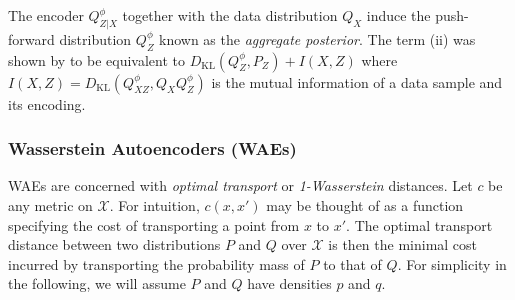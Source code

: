 The encoder $Q^\phi_{Z|X}$ together with the data distribution $Q_X$ induce the push-forward distribution $Q^\phi_Z$ known as the \emph{aggregate posterior}.
The term (ii) was shown by \cite{hoffman2016elbo} to be equivalent to $D_{\text{KL}}(Q^\phi_Z , P_Z) + I(X,Z)$ where $I(X,Z) = D_{\text{KL}}(Q^\phi_{XZ} , Q_XQ^\phi_{Z})$ is the mutual information of a data sample and its encoding.





\subsubsection{Wasserstein Autoencoders (WAEs)}


WAEs \citep{tolstikhin et al} are concerned with \emph{optimal transport} or \emph{1-Wasserstein} distances.
Let $c$ be any metric on $\mathcal{X}$.
For intuition, $c(x, x')$ may be thought of as a function specifying the cost of transporting a point from $x$ to $x'$.
The optimal transport distance between two distributions $P$ and $Q$ over $\mathcal{X}$ is then the minimal cost incurred by transporting the probability mass of $P$ to that of $Q$.
For simplicity in the following, we will assume $P$ and $Q$ have densities $p$ and $q$. 

